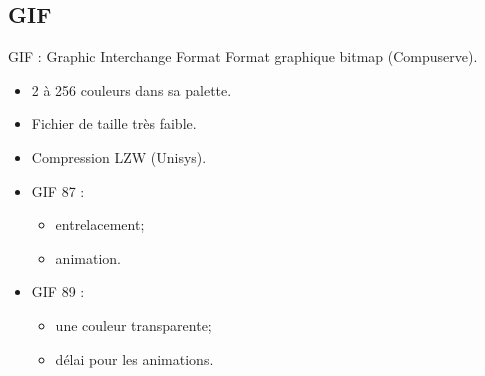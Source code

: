 \documentclass[14pt]{beamer}
\begin{document}
\subsection{GIF}
\begin{frame}{GIF : Graphic Interchange Format}
    Format graphique bitmap (Compuserve).
    \begin{itemize}
    \item 2 à 256 couleurs dans sa palette. 
    \item Fichier de taille très faible.
    \item Compression LZW (Unisys).
    \end{itemize}
    \begin{itemize}
    \item GIF 87 :
        \begin{itemize}
        \item entrelacement;
        \item animation.
        \end{itemize}
    \item GIF 89 :
        \begin{itemize}
        \item une couleur transparente;
        \item délai pour les animations.
        \end{itemize}
    \end{itemize}
\end{frame}


\end{document}
